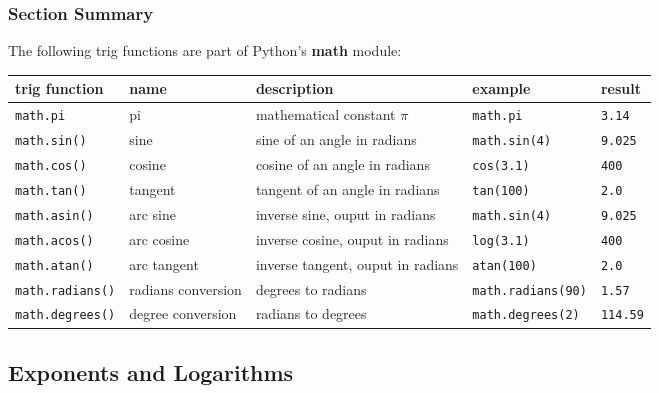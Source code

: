 \documentclass{book}
\newcommand{\passthrough}[1]{#1}
\begin{document}
    
        \hypertarget{section-summary}{%
\subsubsection{Section Summary}\label{section-summary}}

The following trig functions are part of Python's \textbf{math} module:

\begin{longtable}[]{@{}lllll@{}}
\toprule
trig function & name & description & example & result\tabularnewline
\midrule
\endhead
\passthrough{\lstinline!math.pi!} & pi & mathematical constant \(\pi\) &
\passthrough{\lstinline!math.pi!} &
\passthrough{\lstinline!3.14!}\tabularnewline
\passthrough{\lstinline!math.sin()!} & sine & sine of an angle in
radians & \passthrough{\lstinline!math.sin(4)!} &
\passthrough{\lstinline!9.025!}\tabularnewline
\passthrough{\lstinline!math.cos()!} & cosine & cosine of an angle in
radians & \passthrough{\lstinline!cos(3.1)!} &
\passthrough{\lstinline!400!}\tabularnewline
\passthrough{\lstinline!math.tan()!} & tangent & tangent of an angle in
radians & \passthrough{\lstinline!tan(100)!} &
\passthrough{\lstinline!2.0!}\tabularnewline
\passthrough{\lstinline!math.asin()!} & arc sine & inverse sine, ouput
in radians & \passthrough{\lstinline!math.sin(4)!} &
\passthrough{\lstinline!9.025!}\tabularnewline
\passthrough{\lstinline!math.acos()!} & arc cosine & inverse cosine,
ouput in radians & \passthrough{\lstinline!log(3.1)!} &
\passthrough{\lstinline!400!}\tabularnewline
\passthrough{\lstinline!math.atan()!} & arc tangent & inverse tangent,
ouput in radians & \passthrough{\lstinline!atan(100)!} &
\passthrough{\lstinline!2.0!}\tabularnewline
\passthrough{\lstinline!math.radians()!} & radians conversion & degrees
to radians & \passthrough{\lstinline!math.radians(90)!} &
\passthrough{\lstinline!1.57!}\tabularnewline
\passthrough{\lstinline!math.degrees()!} & degree conversion & radians
to degrees & \passthrough{\lstinline!math.degrees(2)!} &
\passthrough{\lstinline!114.59!}\tabularnewline
\bottomrule
\end{longtable}
    




    
        \hypertarget{exponents-and-logarithms}{%
\subsection{Exponents and Logarithms}\label{exponents-and-logarithms}}
    
\end{document}
